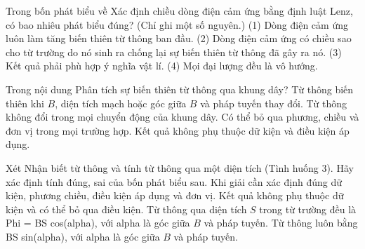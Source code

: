 \begin{ex}
Trong bốn phát biểu về Xác định chiều dòng điện cảm ứng bằng định luật Lenz, có bao nhiêu phát biểu đúng? (Chỉ ghi một số nguyên.) (1) Dòng điện cảm ứng luôn làm tăng biến thiên từ thông ban đầu. (2) Dòng điện cảm ứng có chiều sao cho từ trường do nó sinh ra chống lại sự biến thiên từ thông đã gây ra nó. (3) Kết quả phải phù hợp ý nghĩa vật lí. (4) Mọi đại lượng đều là vô hướng.
\end{ex}

\begin{ex}
Trong nội dung Phân tích sự biến thiên từ thông qua khung dây?
\choice
{\True Từ thông biến thiên khi $B$, diện tích mạch hoặc góc giữa $B$ và pháp tuyến thay đổi.}
{Từ thông không đổi trong mọi chuyển động của khung dây.}
{Có thể bỏ qua phương, chiều và đơn vị trong mọi trường hợp.}
{Kết quả không phụ thuộc dữ kiện và điều kiện áp dụng.}
\end{ex}

\begin{ex}
Xét Nhận biết từ thông và tính từ thông qua một diện tích (Tình huống 3). Hãy xác định tính đúng, sai của bốn phát biểu sau.
\choiceTF
{\True Khi giải cần xác định đúng dữ kiện, phương chiều, điều kiện áp dụng và đơn vị.}
{Kết quả không phụ thuộc dữ kiện và có thể bỏ qua điều kiện.}
{\True Từ thông qua diện tích $S$ trong từ trường đều là Phi = BS cos(alpha), với alpha là góc giữa $B$ và pháp tuyến.}
{Từ thông luôn bằng BS sin(alpha), với alpha là góc giữa $B$ và pháp tuyến.}
\end{ex}


